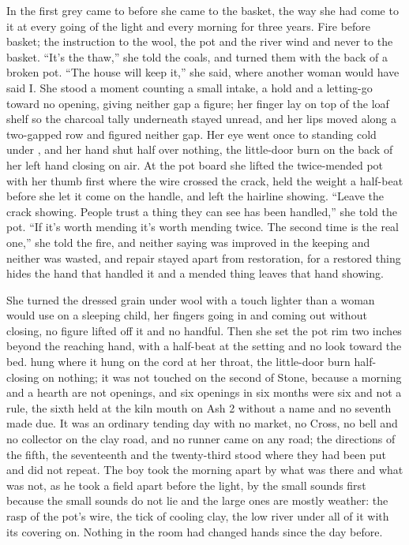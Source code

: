 In the first grey  came to  before she came to the basket, the way she had come to it at every going of the light and every morning for three years. Fire before basket; the instruction to the wool, the pot and the river wind and never to the basket. “It's the thaw,” she told the coals, and turned them with the back of a broken pot. “The house will keep it,” she said, where another woman would have said I. She stood a moment counting a small intake, a hold and a letting-go toward no opening, giving neither gap a figure; her finger lay on top of the loaf shelf so the charcoal tally underneath stayed unread, and her lips moved along a two-gapped row and figured neither gap. Her eye went once to  standing cold under , and her hand shut half over nothing, the little-door burn on the back of her left hand closing on air. At the pot board she lifted the twice-mended pot with her thumb first where the wire crossed the crack, held the weight a half-beat before she let it come on the handle, and left the hairline showing. “Leave the crack showing. People trust a thing they can see has been handled,” she told the pot. “If it's worth mending it's worth mending twice. The second time is the real one,” she told the fire, and neither saying was improved in the keeping and neither was wasted, and repair stayed apart from restoration, for a restored thing hides the hand that handled it and a mended thing leaves that hand showing.

She turned the dressed grain under wool with a touch lighter than a woman would use on a sleeping child, her fingers going in and coming out without closing, no figure lifted off it and no handful. Then she set the pot rim two inches beyond the reaching hand, with a half-beat at the setting and no look toward the bed.  hung where it hung on the cord at her throat, the little-door burn half-closing on nothing; it was not touched on the second of Stone, because a morning and a hearth are not openings, and six openings in six months were six and not a rule, the sixth held at the kiln mouth on Ash 2 without a name and no seventh made due. It was an ordinary tending day with no market, no Cross, no bell and no collector on the clay road, and no runner came on any road; the directions of the fifth, the seventeenth and the twenty-third stood where they had been put and did not repeat. The boy took the morning apart by what was there and what was not, as he took a field apart before the light, by the small sounds first because the small sounds do not lie and the large ones are mostly weather: the rasp of the pot's wire, the tick of cooling clay, the low river under all of it with its covering on. Nothing in the room had changed hands since the day before.

